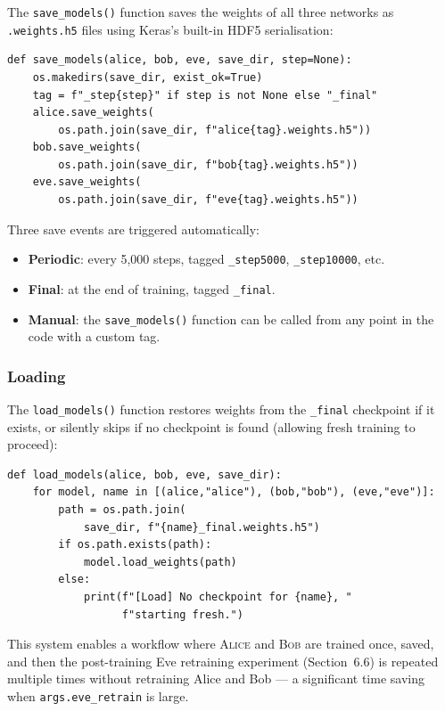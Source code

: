 \documentclass[12pt, a4paper]{article}
\newcommand{\alice}{\textsc{Alice}}
\newcommand{\bob}{\textsc{Bob}}
\newcommand{\code}[1]{\texttt{\color{CodeRed}#1}}
\begin{document}
The \code{save\_models()} function saves the weights of all three
networks as \texttt{.weights.h5} files using Keras's built-in HDF5
serialisation:

\begin{lstlisting}[caption={Model saving in \code{save\_models()}}]
def save_models(alice, bob, eve, save_dir, step=None):
    os.makedirs(save_dir, exist_ok=True)
    tag = f"_step{step}" if step is not None else "_final"
    alice.save_weights(
        os.path.join(save_dir, f"alice{tag}.weights.h5"))
    bob.save_weights(
        os.path.join(save_dir, f"bob{tag}.weights.h5"))
    eve.save_weights(
        os.path.join(save_dir, f"eve{tag}.weights.h5"))
\end{lstlisting}

Three save events are triggered automatically:
\begin{itemize}[leftmargin=1.8em, itemsep=3pt]
  \item \textbf{Periodic}: every 5{,}000 steps, tagged
        \code{\_step5000}, \code{\_step10000}, etc.
  \item \textbf{Final}: at the end of training, tagged \code{\_final}.
  \item \textbf{Manual}: the \code{save\_models()} function can be
        called from any point in the code with a custom tag.
\end{itemize}

\subsubsection*{Loading}

The \code{load\_models()} function restores weights from the
\code{\_final} checkpoint if it exists, or silently skips if no
checkpoint is found (allowing fresh training to proceed):

\begin{lstlisting}[caption={Model loading in \code{load\_models()}}]
def load_models(alice, bob, eve, save_dir):
    for model, name in [(alice,"alice"), (bob,"bob"), (eve,"eve")]:
        path = os.path.join(
            save_dir, f"{name}_final.weights.h5")
        if os.path.exists(path):
            model.load_weights(path)
        else:
            print(f"[Load] No checkpoint for {name}, "
                  f"starting fresh.")
\end{lstlisting}

This system enables a workflow where \alice{} and \bob{} are trained
once, saved, and then the post-training Eve retraining experiment
(Section~6.6) is repeated multiple times without retraining Alice and
Bob --- a significant time saving when \code{args.eve\_retrain} is
large.
\end{document}
